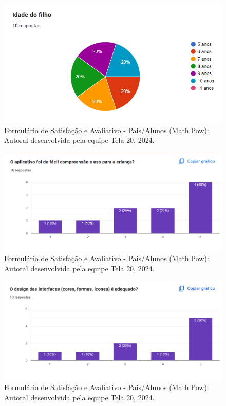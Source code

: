 \documentclass[12pt, openany, oneside, a4paper, english, brazil]{abntex2}   %
\begin{document}
\begin{figure}
    \centering
    \includegraphics{figuras/Formulário Gráficos/Pais/6 idade dos filhos.png}
    \caption{Formulário de Satisfação e Avaliativo  - Pais/Alunos (Math.Pow):  Autoral desenvolvida pela equipe Tela 20, 2024.}
    \label{gráfico gerado pelo formulário}
\end{figure}

\begin{figure}
    \centering
    \includegraphics{figuras/Formulário Gráficos/Pais/7 O aplicativo foi de facil compreensao e uso para a crianca.png}
    \caption{Formulário de Satisfação e Avaliativo  - Pais/Alunos (Math.Pow):  Autoral desenvolvida pela equipe Tela 20, 2024.}
    \label{gráfico gerado pelo formulário}
\end{figure}

\begin{figure}
    \centering
    \includegraphics{figuras/Formulário Gráficos/Pais/8 O design das interfaces e adequado.png}
    \caption{Formulário de Satisfação e Avaliativo  - Pais/Alunos (Math.Pow):  Autoral desenvolvida pela equipe Tela 20, 2024.}
    \label{gráfico gerado pelo formulário}
\end{figure}
\end{document}
